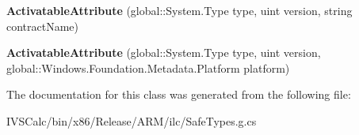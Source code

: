 \begin{DoxyCompactItemize}
\item 
\mbox{\label{class_windows_1_1_foundation_1_1_metadata_1_1_activatable_attribute_a765085efebfd0bcd0be210e056f09933}} 
{\bfseries Activatable\+Attribute} (global\+::\+System.\+Type type, uint version, string contract\+Name)
\item 
\mbox{\label{class_windows_1_1_foundation_1_1_metadata_1_1_activatable_attribute_a406f07b4e02527c717e7403d999d4443}} 
{\bfseries Activatable\+Attribute} (global\+::\+System.\+Type type, uint version, global\+::\+Windows.\+Foundation.\+Metadata.\+Platform platform)
\end{DoxyCompactItemize}


The documentation for this class was generated from the following file\+:\begin{DoxyCompactItemize}
\item 
I\+V\+S\+Calc/bin/x86/\+Release/\+A\+R\+M/ilc/Safe\+Types.\+g.\+cs\end{DoxyCompactItemize}

